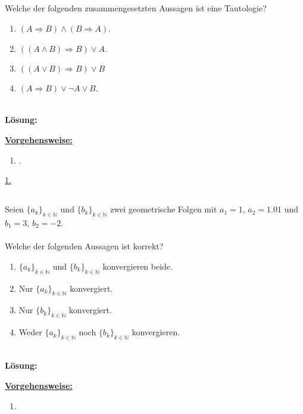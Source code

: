 \subsection*{}
Welche der folgenden zusammengesetzten Aussagen ist eine Tautologie? 
\renewcommand{\labelenumi}{(\alph{enumi})}
\begin{enumerate}
	\item $(A \Rightarrow B ) \wedge (B \Rightarrow A)$.
	\item $ ((A \wedge B) \Rightarrow B) \vee A$.
	\item $ ((A \vee B) \Rightarrow B) \vee B$
	\item $(A \Rightarrow B ) \vee \neg A \vee B$.
\end{enumerate}
\ \\
\textbf{Lösung:}
\begin{mdframed}
	\underline{\textbf{Vorgehensweise:}}
	\renewcommand{\labelenumi}{\theenumi.}
	\begin{enumerate}
		\item .
	\end{enumerate}
\end{mdframed}
\underline{1. }\\

 

\newpage
\subsection*{}
Seien $\{a_k\}_{k \in \mathbb{N}}$ und $\{b_k\}_{k \in \mathbb{N}}$ zwei geometrische Folgen mit $a_1 = 1$, $a_2= 1.01$ und $b_1 = 3$, $b_2 = -2$.\\
\\
Welche der folgenden Aussagen ist korrekt? 
\renewcommand{\labelenumi}{(\alph{enumi})}
\begin{enumerate}
	\item 
	$\{a_k\}_{k \in \mathbb{N}}$ und $\{b_k\}_{k \in \mathbb{N}}$ konvergieren beide.
	\item 
	Nur $\{a_k\}_{k \in \mathbb{N}}$ konvergiert.
	\item 
	Nur $\{b_k\}_{k \in \mathbb{N}}$ konvergiert.
	\item
	Weder $\{a_k\}_{k \in \mathbb{N}}$ noch $\{b_k\}_{k \in \mathbb{N}}$ konvergieren.
\end{enumerate}
\ \\
\textbf{Lösung:}
\begin{mdframed}
\underline{\textbf{Vorgehensweise:}}
\renewcommand{\labelenumi}{\theenumi.}
\begin{enumerate}
\item 
\end{enumerate}
\end{mdframed}

